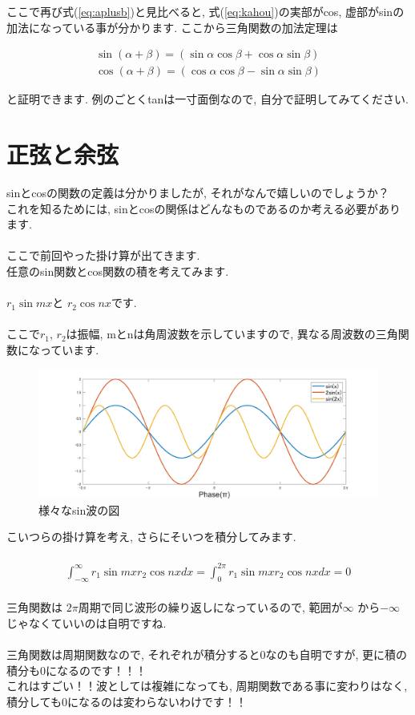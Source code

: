 \documentclass[11pt,a4paper,uplatex]{ujreport}
\begin{document}
ここで再び式(\ref{eq:aplusb})と見比べると, 式(\ref{eq:kahou})の実部がcos, 虚部がsinの加法になっている事が分かります. ここから三角関数の加法定理は


\begin{eqnarray}
\sin (\alpha + \beta) = (\sin\alpha\cos\beta + \cos\alpha\sin\beta)\\
\cos (\alpha + \beta) = (\cos\alpha\cos\beta - \sin\alpha\sin\beta)
\label{kahouteiri}
\end{eqnarray}

と証明できます. 例のごとくtanは一寸面倒なので, 自分で証明してみてください.
\section{正弦と余弦}
sinとcosの関数の定義は分かりましたが, それがなんで嬉しいのでしょうか？\\
これを知るためには, sinとcosの関係はどんなものであるのか考える必要があります.\\
\\
ここで前回やった掛け算が出てきます. \\
任意のsin関数とcos関数の積を考えてみます.\\
\\
$r_1\sin mx $と $r_2\cos nx $です.\\
\\
ここで$r_1$, $r_2$は振幅, mとnは角周波数を示していますので, 異なる周波数の三角関数になっています.\\

\begin{figure}[H]
\label{im:sines}
  \centering
  \includegraphics[width=360mm,bb=0 0 1700 300]{../figures/sines.png}
  \caption{様々なsin波の図}
\end{figure}

こいつらの掛け算を考え, さらにそいつを積分してみます.\\
\\
\begin{eqnarray}
\label{eq:cosint}
  \int^\infty_{-\infty} r_1\sin mx r_2\cos nx dx = \int^{2\pi}_0 r_1\sin mx r_2\cos nx dx = 0
\end{eqnarray}
\\
三角関数は $2\pi$周期で同じ波形の繰り返しになっているので, 範囲が$\infty$ から$-\infty$じゃなくていいのは自明ですね.\\
\\
三角関数は周期関数なので, それぞれが積分すると0なのも自明ですが, 更に積の積分も0になるのです！！！\\
これはすごい！！波としては複雑になっても, 周期関数である事に変わりはなく, 積分しても0になるのは変わらないわけです！！\\
\end{document}
